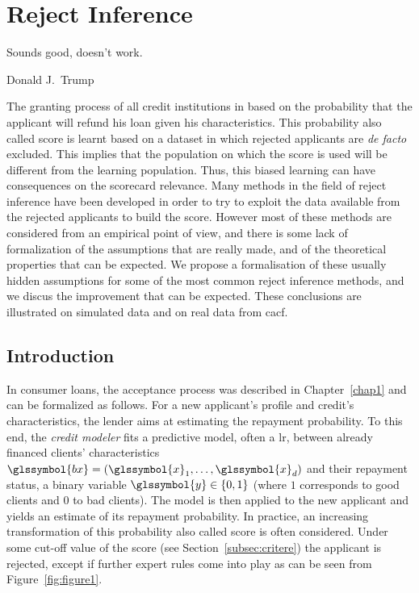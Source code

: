 
\chapter{Reject Inference} \label{chap2}

\epigraph{Sounds good, doesn't work.}{Donald J.\ Trump}

\minitoc


\bigskip

The granting process of all credit institutions in based on the probability that the applicant will refund his loan given his characteristics. This probability also called \gls{score} is learnt based on a dataset in which rejected applicants are \textit{de facto} excluded. This implies that the population on which the \gls{score} is used will be different from the learning population. Thus, this biased learning can have consequences on the scorecard relevance. Many methods in the field of reject inference have been developed in order to try to exploit the data available from the rejected applicants to build the score. However most of these methods are considered from an empirical point of view, and there is some lack of formalization of the assumptions that are really made, and of the theoretical properties that can be expected. We propose a formalisation of these usually hidden assumptions for some of the most common reject inference methods, and we discus the improvement that can be expected. These conclusions are illustrated on simulated data and on real data from \gls{cacf}.

\section{Introduction}

In consumer loans, the acceptance process was described in Chapter~\ref{chap1} and can be formalized as follows. For a new applicant's profile and credit's characteristics, the lender aims at estimating the repayment probability. To this end, the \textit{credit modeler} fits a predictive model, often a \gls{lr}, between already  financed  clients' characteristics $\glssymbol{bx}=(\glssymbol{x}_1,\ldots,\glssymbol{x}_d)$ and their repayment status, a binary variable $\glssymbol{y}\in\{0,1\}$ (where $1$ corresponds to good clients and $0$ to bad clients). The model is then applied to the new applicant and yields an estimate of its repayment probability. In practice, an increasing transformation of this probability also called score is often considered.
Under some cut-off value of the \gls{score} (see Section~\ref{subsec:critere}) the applicant is rejected, except if further expert rules come into play as can be seen from Figure~\ref{fig:figure1}.

